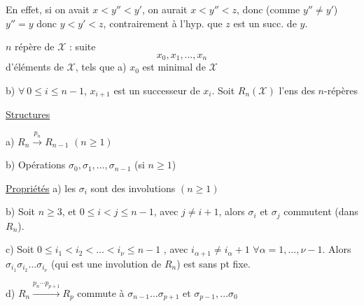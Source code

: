 En effet, si on avait  $x<y''<y'$, on aurait $x<y''<z$, donc (comme $y''\ne y'$) $y''=y$ donc $y<y'<z$, contrairement à l'hyp. que $z$ est un succ. de $y$.


$n$ répère de $\mathcal X$  : suite
\[
x_0,x_1,\ldots,x_n
\]
d'éléments de $\mathcal X$, tels que a) $x_0$ est minimal de $\mathcal X$

b) $\forall\ 0\le i\le n-1$, $x_{i+1}$ est un successeur de $x_i$. Soit $R_n(\mathcal X)$ l'ens des $n$-répères

\uline{Structures}

a) $R_n\xrightarrow{p_n}R_{n-1}$ \qquad $(n\ge1)$

b) Opérations $\sigma_0,\sigma_1,\ldots,\sigma_{n-1}$ \quad (si $n\ge1$)

\uline{Propriétés} \quad a) les $\sigma_i$ sont des involutions $(n\ge1)$

b) Soit $n\ge3$, et $0\le i<j\le n-1$, avec $j\ne i+1$, alors $\sigma_i$ et $\sigma_j$ commutent  (dans $R_n$).

c) Soit $0\le i_1<i_2<\ldots<i_\nu\le n-1$ , avec $i_{\alpha+1}\ne i_\alpha+1$ $\forall\alpha=1,\ldots,\nu-1$. Alors $\sigma_{i_1}\sigma_{i_2}\ldots\sigma_{i_\nu}$ (qui est une involution de $R_n$) est sans pt fixe.

d) $R_n\xrightarrow{p_n\cdots p_{p+1}}R_p$ commute à $\sigma_{n-1}\ldots\sigma_{p+1}$ et $\sigma_{p-1},\ldots\sigma_0$


